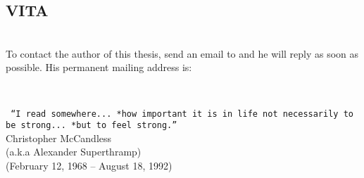 \cleardoublepage
\thispagestyle{empty}
\begin{center}
\section*{VITA}
\end{center}

\strut \vfill

\noindent\\

\noindent To contact the author of this thesis, send an email to {\texttt{\myEmailAddress}} and he will reply as soon as possible. His permanent mailing address is:\\

%
\begin{minipage}[t]{.5\textwidth}
	\begin{flushleft}
		\texttt{\myMailingAddress} 
	\end{flushleft}
\end{minipage}
\begin{minipage}[t]{.5\textwidth}
\hfill
\end{minipage}
\\

\vspace*{10em}

\begin{minipage}[t]{.5\textwidth}
\hfill
\end{minipage}
\begin{minipage}[t]{.5\textwidth}
	\begin{flushright}
	\texttt{ ``I read somewhere...\\*how important it is in life not necessarily to be strong...\\*but to feel strong.''}\\
	Christopher McCandless\\(a.k.a Alexander Superthramp)\\(February 12, 1968 -- August 18, 1992)\end{flushright}
\end{minipage}
\strut \vfill

\newpage
\thispagestyle{empty}
\strut \vfill
